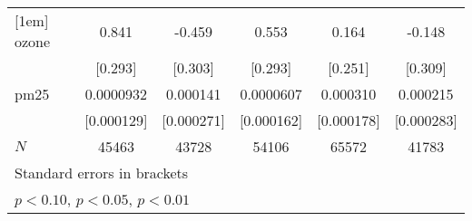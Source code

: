 \documentclass[11pt]{article}
\begin{document}
\begin{subappendices}
\begin{center}
{{\begin{tabular}{l*{5}{c}}
						[1em]
						ozone       &       0.841\sym{***}&      -0.459         &       0.553\sym{*}  &       0.164         &      -0.148         \\
						&     [0.293]         &     [0.303]         &     [0.293]         &     [0.251]         &     [0.309]         \\
						[1em]
						pm25        &   0.0000932         &    0.000141         &   0.0000607         &    0.000310\sym{*}  &    0.000215         \\
						&  [0.000129]         &  [0.000271]         &  [0.000162]         &  [0.000178]         &  [0.000283]         \\
						\hline
						\(N\)       &       45463         &       43728         &       54106         &       65572         &       41783         \\
						\hline\hline
						\multicolumn{6}{l}{\footnotesize Standard errors in brackets}\\
						\multicolumn{6}{l}{\footnotesize \sym{*} \(p<0.10\), \sym{**} \(p<0.05\), \sym{***} \(p<0.01\)}\\
					\end{tabular}
				}
				
			}
		\end{center}
		
		
		\begin{center}
			 \label{tab:title} 
			{
				
			}
		\end{center}
		
		
		\begin{center}
			 \label{tab:title} 
			{
				
			}
		\end{center}
		
		
		
		
		
		
	\end{subappendices}	
	
	
	
	
	\newpage
	{\footnotesize 
		
		\singlespacing
		
	}
	
	
\end{document}
